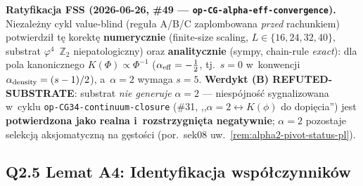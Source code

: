 \begin{uwaga}[KOREKTA \texttt{op-A3-alpha-resolution} (2026-06-14) --- $\alpha$ NIE jest niezmiennikiem $\Phi=\phi^2$]
\medskip\noindent\textbf{Ratyfikacja FSS (2026-06-26, \#49 --- \texttt{op-CG-alpha-eff-convergence}).}
Niezale\.zny cykl value-blind (regu\l{}a A/B/C zaplombowana \emph{przed} rachunkiem) potwierdzi\l{}
t\k{e} korekt\k{e} \textbf{numerycznie} (finite-size scaling, $L\in\{16,24,32,40\}$, substrat
$\varphi^4$~$\mathbb{Z}_2$ niepatologiczny) oraz \textbf{analitycznie} (sympy, chain-rule \emph{exact}):
dla pola kanonicznego $K(\Phi)\propto\Phi^{-1}$ ($\alpha_{\rm eff}=-\tfrac12$, tj.\ $s=0$ w~konwencji
$\alpha_{\rm density}=(s-1)/2$), a~$\alpha=2$ wymaga $s=5$. \textbf{Werdykt (B) REFUTED-SUBSTRATE}:
substrat \emph{nie generuje} $\alpha=2$ --- niespójno\'s\'c sygnalizowana w~cyklu
\texttt{op-CG34-continuum-closure} (\#31, ,,$\alpha=2\leftrightarrow K(\phi)$ do dopi\k{e}cia'')
jest \textbf{potwierdzona jako realna i~rozstrzygni\k{e}ta negatywnie}; $\alpha=2$ pozostaje
selekcj\k{a} aksjomatyczn\k{a} na g\k{e}sto\'sci (por.\ sek08 uw.~\ref{rem:alpha2-pivot-status-pl}).
\end{uwaga}

\subsection*{Q2.5 Lemat A4: Identyfikacja wsp\'o\l{}czynnik\'ow}
\label{ssec:lemma-A4}

